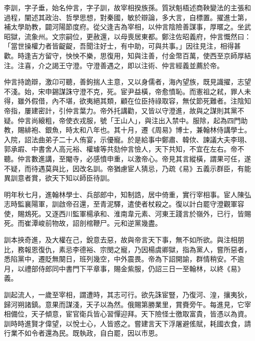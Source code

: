 
\begin{pinyinscope}

 李訓，字子垂，始名仲言，字子訓，故宰相揆族孫。質狀魁梧述商鞅變法的主張和過程，闡述其政治、哲學思想，對秦國，敏於辯論，多大言，自標置。擢進士第，補太學助教，闢河陽節度府。從父逢吉為宰相，以仲言陰險善謀事，厚暱之。坐武昭獄，流象州。文宗嗣位，更赦還，以母喪居東都。鄭注佐昭義府，仲言慨然曰：「當世操權力者皆齪齪，吾聞注好士，有中助，可與共事。」因往見注，相得甚歡。時逢吉方留守，怏怏不樂，思復用，知與注善，付金幣百萬，使西至京師厚結注。注喜，介之謁王守澄。守澄善遇之，即以注術、仲言經義並薦於帝。



 仲言持詭辯，激卬可聽，善鉤揣人主意，又以身儒者，海內望族，既見識擢，志望不淺。始，宋申錫謀誅守澄不克，死。宦尹益橫，帝愈憤恥。而憲祖之弒，罪人未得，雖外假借，內不堪，欲夷絕其類，顧在位臣持祿取容，無仗節死難者。注陰知帝指，屢建密計，引仲言葉力。帝外托講勸，又皆以守澄進，故與之謀則其黨不疑。仲言尚縗粗，帝使衣戎服，號「王山人」，與注出入禁中。服除，起為四門助教，賜緋袍、銀魚，時太和八年也。其十月，遷《周易》博士，兼翰林侍講學士。入院，詔法曲弟子二十人侑宴，示優寵。於是給事中鄭肅、韓佽、諫議大夫李珝、郭承嘏、中書舍人高元裕、權璩等共劾仲言憸人，天下共知，不宜在左右。帝不聽。仲言數進講，至閹寺，必感憤申重，以激帝心。帝見其言縱橫，謂果可任，遂不疑，而待遇莫與比，因改名訓。帝猶慮宦人猜忌，乃疏《易》五義示群臣，有能異訓意者賞，欲天下知以師臣待訓。



 明年秋七月，進翰林學士、兵部郎中，知制誥，居中倚重，實行宰相事。宦人陳弘志時監襄陽軍，訓啟帝召還，至青泥驛，遣使者杖殺之。復以計白罷守澄觀軍容使，賜鴆死。又逐西川監軍楊承和、淮南韋元素、河東王踐言於嶺外，已行，皆賜死。而崔潭峻前物故，詔剖棺鞭尸。元和逆黨幾盡。



 訓本挾奇進，及大權在己，銳意去惡，故與帝言天下事，無不如所欲。與注相朋比，務報恩復仇，素忌李德裕、宗閔之寵，乃因楊虞卿獄，指為黨人，嘗所惡者，悉陷黨中，遷貶無闋日，班列幾空，中外震畏。帝為下詔開諭，群情稍安。不逾月，以禮部侍郎同中書門下平章事，賜金紫服，仍詔三日一至翰林，以終《易》義。



 訓起流人，一歲至宰相，謂遭時，其志可行。欲先誅宦豎，乃復河、湟，攘夷狄，歸河朔諸鎮。意果而謀淺，天子以為然。俄賜第勝業里，賞賚旁午。每進見，它宰相備位，天子傾意，宦官衛兵皆心習憚迎拜。天下險怪士徼取富貴，皆憑以為資。訓時時進賢才偉望，以悅士心，人皆惑之。嘗建言天下浮屠避傜賦，耗國衣食，請行業不如令者還為民。既執政，自白罷，因以市恩。




\end{pinyinscope}
